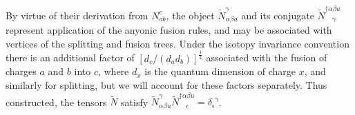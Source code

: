 \documentclass[aps,prb,reprint,superscriptaddress,amsfonts,amsmath,amssymb,showpacs,floatfix]{revtex4-1}
\newcommand{\mbb}[1]{\mathbb{#1}}
\newcommand{\p}[1]{\phantom{#1}}
\begin{document}

By virtue of their derivation from $N^{c}_{ab}$, the object $\tilde N^\gamma_{\alpha\beta u}$ and its conjugate $\tilde N^{\dagger\alpha\beta u}_{\phantom{\dagger}\gamma}$ 
represent application of the anyonic fusion rules, and may be associated with vertices of the splitting and fusion trees. Under the isotopy invariance convention there is an additional factor of $[d_{c}/(d_{a}d_{b})]^\frac{1}{4}$ associated with the fusion of %
charges $a$ and $b$ into $c$, where $d_{x}$ is the quantum dimension of charge $x$, and similarly for splitting, but we will account for these factors separately. Thus constructed, the tensors $\tilde N$ satisfy $\tilde N^\gamma_{\alpha\beta u}\tilde N^{\dagger\alpha\beta u}_{\p\dagger\epsilon}=\delta_\epsilon^{\p\epsilon\gamma}$.


\end{document}
